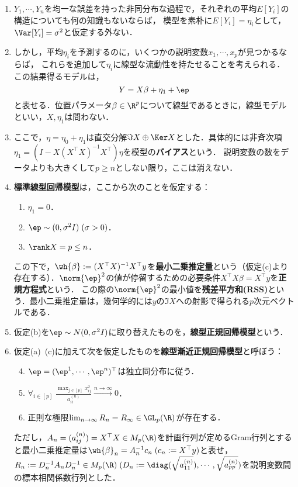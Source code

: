 \documentclass[uplatex,dvipdfmx]{jsreport}
\begin{document}
\begin{model}[線型回帰模型総覧]\mbox{}
    \begin{enumerate}
        \item $Y_1,\cdots,Y_n$を均一な誤差を持った非同分布な過程で，それぞれの平均$E[Y_i]$の構造についても何の知識もないならば，
        模型を素朴に$E[Y_i]=\eta_i$として，$\Var[Y_i]=\sigma^2$と仮定する外ない．
        \item しかし，平均$\eta_i$を予測するのに，いくつかの説明変数$x_1,\cdots,x_p$が見つかるならば，
        これらを追加して$\eta_i$に線型な流動性を持たせることを考えられる．
        この結果得るモデルは，
        \[Y=X\beta+\eta_1+\ep\]
        と表せる．位置パラメータ$\beta\in\R^p$について線型であるときに，線型モデルといい，$X,\eta_1$は問わない．

        \item ここで，$\eta=\eta_0+\eta_1$は直交分解$\Im X\oplus\Ker X$とした．具体的には非斉次項$\eta_1=(I-X(X^\top X)^{-1}X^\top)\eta$を模型の\textbf{バイアス}という．
        説明変数の数をデータよりも大きくして$p\ge n$としない限り，ここは消えない．
        \item \textbf{標準線型回帰模型}は，ここから次のことを仮定する：
        \begin{enumerate}
            \item $\eta_1=0$．
            \item $\ep\sim(0,\sigma^2I)\;(\sigma>0)$．
            \item $\rank X=p\le n$．
        \end{enumerate}
        この下で，$\wh{\beta}:=(X^\top X)^{-1}X^\top y$を\textbf{最小二乗推定量}という（仮定(c)より存在する）．$\norm{\ep}^2$の値が停留するための必要条件$X^\top X\beta=X^\top y$を\textbf{正規方程式}という．
        この際の$\norm{\ep}^2$の最小値を\textbf{残差平方和(RSS)}という．最小二乗推定量は，幾何学的には$y$の$\Im X$への射影で得られる$p$次元ベクトルである．
        \item 仮定(b)を$\ep\sim N(0,\sigma^2I)$に取り替えたものを，\textbf{線型正規回帰模型}という．
        \item 仮定(a)~(c)に加えて次を仮定したものを\textbf{線型漸近正規回帰模型}と呼ぼう：
        \begin{enumerate}\setcounter{enumi}{3}
            \item $\ep=(\ep^1,\cdots,\ep^n)^\top$は独立同分布に従う．
            \item $\forall_{i\in[p]}\;\frac{\max_{j\in[p]}x_{ij}^2}{a_{ii}^{(n)}}\xrightarrow{n\to\infty}0$．
            \item 正則な極限$\lim_{n\to\infty}R_n=R_\infty\in\GL_p(\R)$が存在する．
        \end{enumerate}
        ただし，$A_n=(a_{ij}^{(n)})=X^\top X\in M_p(\R)$を計画行列が定めるGram行列とすると最小二乗推定量は$\wh{\beta}_n=A_n^{-1}c_n\;(c_n:=X^\top y)$と表せ，
        $R_n:=D_n^{-1}A_nD_n^{-1}\in M_p(\R)\;(D_n:=\diag(\sqrt{a_{11}^{(n)}}),\cdots,\sqrt{a_{pp}^{(n)}})$を説明変数間の標本相関係数行列とした．
    \end{enumerate}
\end{model}
\end{document}
